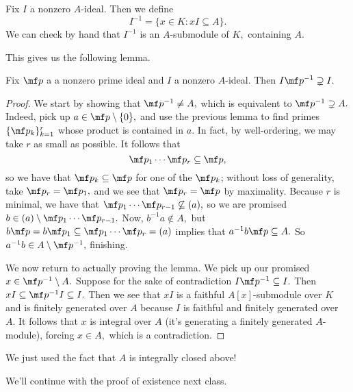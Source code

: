 \begin{defi}
    Fix $I$ a nonzero $A$-ideal. Then we define
    \[I^{-1}=\{x\in K:xI\subseteq A\}.\]
    We can check by hand that $I^{-1}$ is an $A$-submodule of $K,$ containing $A.$
\end{defi}
This gives us the following lemma.
\begin{lem}
    Fix $\mf p$ a a nonzero prime ideal and $I$ a nonzero $A$-ideal. Then $I\mf p^{-1}\supsetneq I.$
\end{lem}
\begin{proof}
    We start by showing that $\mf p^{-1}\ne A,$ which is equivalent to $\mf p^{-1}\supsetneq A.$ Indeed, pick up $a\in\mf p\setminus\{0\},$ and use the previous lemma to find primes $\{\mf p_k\}_{k=1}^r$ whose product is contained in $a.$ In fact, by well-ordering, we may take $r$ as small as possible. It follows that
    \[\mf p_1\cdots\mf p_r\subseteq\mf p,\]
    so we have that $\mf p_k\subseteq\mf p$ for one of the $\mf p_k$; without loss of generality, take $\mf p_r=\mf p_1,$ and we see that $\mf p_r=\mf p$ by maximality. Because $r$ is minimal, we have that $\mf p_1\cdots\mf p_{r-1}\not\subseteq(a),$ so we are promised $b\in(a)\setminus\mf p_1\cdots\mf p_{r-1}.$ Now, $b^{-1}a\notin A,$ but $b\mf p=b\mf p_1\subseteq\mf p_1\cdots\mf p_r=(a)$ implies that $a^{-1}b\mf p\subseteq A.$ So $a^{-1}b\in A\setminus\mf p^{-1},$ finishing.
    
    We now return to actually proving the lemma. We pick up our promised $x\in\mf p^{-1}\setminus A.$ Suppose for the sake of contradiction $I\mf p^{-1}\subseteq I.$ Then $xI\subseteq\mf p^{-1}I\subseteq I.$ Then we see that $xI$ is a faithful $A[x]$-submodule over $K$ and is finitely generated over $A$ because $I$ is faithful and finitely generated over $A.$ It follows that $x$ is integral over $A$ (it's generating a finitely generated $A$-module), forcing $x\in A,$ which is a contradiction.
\end{proof}
\begin{remark}
    We just used the fact that $A$ is integrally closed above!
\end{remark}
We'll continue with the proof of existence next class.